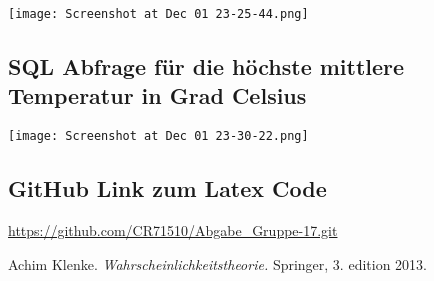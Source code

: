 \documentclass{article}
\begin{document}
\texttt{[image: Screenshot at Dec 01 23-25-44.png]}

\subsection{SQL Abfrage für die höchste mittlere Temperatur in Grad Celsius }

\texttt{[image: Screenshot at Dec 01 23-30-22.png]}

\subsection{GitHub Link zum Latex Code}
\url{https://github.com/CR71510/Abgabe_Gruppe-17.git}

\newpage
\begin{thebibliography}{9}
     Achim Klenke. \emph{Wahrscheinlichkeitstheorie.} Springer, 3. edition 2013.
\end{thebibliography}
\end{document}
